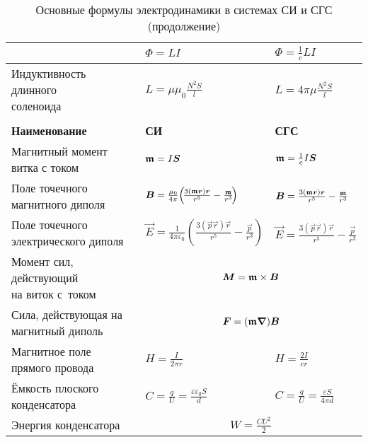 \begin{booksupplement}
\begin{longtable}{p{40mm}p{30mm}p{30mm}}
        & $\Phi=LI$	&    $\Phi=\frac{1}{c}LI$	\bigstrut\\ \hline
\parbox{40mm}{Индуктивность длинного\\[-2.5pt] соленоида}
        & $L=\mu\mu_0\frac{N^2S}{l}$    &   $L=4\pi\mu \frac{N^2S}{l}$	\bigstrut\\ \hline
\newpage
\caption[]{Основные формулы электродинамики в системах СИ и СГС (продолжение)}  \\
\toprule[1pt]
\textbf{Наименование} & \textbf{СИ} & \textbf{СГС} \\
\midrule[1pt]
\parbox{40mm}{Магнитный момент\\[-2.5pt] витка с током}
        & ${\boldsymbol{\mathfrak{m}  }}=I{\boldsymbol{S}}$		&   ${\boldsymbol{\mathfrak{m}  }}=\frac{1}{c}I{\boldsymbol{S}}$	\bigstrut\\ \hline
\parbox{40mm}{Поле точечного\\[-2.5pt] магнитного диполя}
        & ${\boldsymbol{B}}=\frac{\mu_0}{4\pi}\!\left(\!\frac{3({\boldsymbol{\mathfrak{m}}}{\boldsymbol{r}}){\boldsymbol{r}}}{r^5}-\frac{{\boldsymbol{\mathfrak{m}}}}{r^3}\!\right)$
        & ${\boldsymbol{B}}=\frac{3({\boldsymbol{\mathfrak{m}}}{\boldsymbol{r}}){\boldsymbol{r}}}{r^5}-\frac{{\boldsymbol{\mathfrak{m}}}}{r^3}$ \bigstrut\\ \hline
\parbox{40mm}{Поле точечного\\[-2.5pt] электрического диполя}
        & $\vec{E}=\frac{1}{4\pi\varepsilon_0}\!\left(\!\frac{3(\vec{p}\vec{r})\vec{r}}{r^5}-\frac{\vec{p}}{r^3}\!\right)$
        & $\vec{E}=\frac{3(\vec{p}\vec{r})\vec{r}}{r^5}-\frac{\vec{p}}{r^3}$ \bigstrut\\ \hline
\parbox{40mm}{Момент сил, действующий\\[-2.5pt] на виток с~током}
        & \bigstrut\\ \hline
\parbox{40mm}{Сила, действующая на\\[-2.5pt] магнитный диполь}
        &  \bigstrut\\ \hline
\parbox{40mm}{Магнитное поле\\[-2.pt] прямого провода}
    & $H = \frac{I}{2\pi r}$ & $H=\frac{2I}{cr}$ \bigstrut \\ \hline
\parbox{40mm}{Ёмкость плоского\\[-2.5pt] конденсатора}
        & $C=\frac{q}{U}=\frac{\varepsilon\varepsilon_0S}{d}$
        & $C=\frac{q}{U}=\frac{\varepsilon S}{4\pi d}$ \bigstrut \\ \hline
Энергия конденсатора
        &  \bigstrut\\
\bottomrule[1pt]
\end{longtable}
\endgroup


\end{booksupplement}
